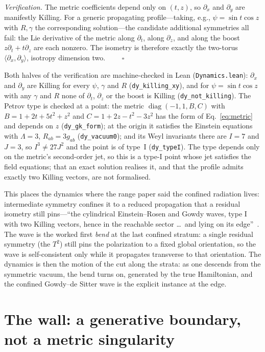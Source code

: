 \documentclass[11pt,a4paper]{article}
\theoremstyle{plain}
\theoremstyle{definition}
\theoremstyle{remark}
\begin{document}
\noindent\emph{Verification.} The metric coefficients depend only on $(t,z)$, so $\partial_x$ and $\partial_y$ are manifestly Killing. For a generic propagating profile---taking, e.g., $\psi=\sin t\cos z$ with $R,\gamma$ the corresponding solution---the candidate additional symmetries all fail: the Lie derivative of the metric along $\partial_t$, along $\partial_z$, and along the boost $z\partial_t+t\partial_z$ are each nonzero. The isometry is therefore exactly the two-torus $\langle\partial_x,\partial_y\rangle$, isotropy dimension two. $\qquad\square$

\noindent Both halves of the verification are machine-checked in Lean (\texttt{Dynamics.lean}): $\partial_x$ and $\partial_y$ are Killing for every $\psi$, $\gamma$ and $R$ (\texttt{dy\_killing\_xy}), and for $\psi=\sin t\cos z$ with any $\gamma$ and $R$ none of $\partial_t$, $\partial_z$ or the boost is Killing (\texttt{dy\_not\_killing}). The Petrov type is checked at a point: the metric $\operatorname{diag}(-1,1,B,C)$ with $B=1+2t+5t^{2}+z^{2}$ and $C=1+2z-t^{2}-3z^{2}$ has the form of Eq.~\eqref{eq:metric} and depends on $z$ (\texttt{dy\_gk\_form}); at the origin it satisfies the Einstein equations with $\Lambda=3$, $R_{ab}=3g_{ab}$ (\texttt{dy\_vacuum0}); and its Weyl invariants there are $I=7$ and $J=3$, so $I^{3}\neq27J^{2}$ and the point is of type~I (\texttt{dy\_typeI}). The type depends only on the metric's second-order jet, so this is a type-I point whose jet satisfies the field equations; that an exact solution realises it, and that the profile admits exactly two Killing vectors, are not formalised.

This places the dynamics where the range paper said the confined radiation lives: intermediate symmetry confines it to a reduced propagation that a residual isometry still pins---``the cylindrical Einstein--Rosen and Gowdy waves, type I with two Killing vectors, hence in the reachable sector \dots\ and lying on its edge''~\cite{JanzenRange}. The wave is the worked first \emph{bend} at the last confined stratum: a single residual symmetry (the $T^2$) still pins the polarization to a fixed global orientation, so the wave is self-consistent only while it propagates transverse to that orientation. The dynamics is then the motion of the cut along the strata: as one descends from the symmetric vacuum, the bend turns on, generated by the true Hamiltonian, and the confined Gowdy--de Sitter wave is the explicit instance at the edge.

\section{The wall: a generative boundary, not a metric singularity}\label{sec:wall}
\end{document}
